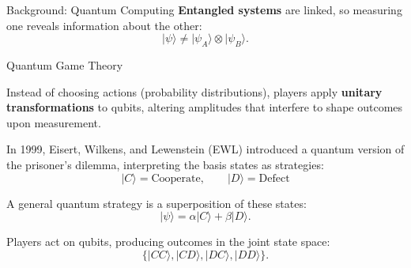 \documentclass[final]{beamer}
\newlength{\colwidth}
\begin{document}
\begin{frame}[t]
\begin{columns}[t]
\begin{column}{\colwidth}
\begin{block}{Background: Quantum Computing}
					\textbf{Entangled systems} are linked, so measuring one reveals information about the other:
					\[
					|\psi\rangle \neq |\psi_A\rangle \otimes |\psi_B\rangle.
					\]
					
				\end{block}
				
				\begin{block}{Quantum Game Theory}
					
					Instead of choosing actions (probability distributions), players apply \textbf{unitary transformations} to qubits, altering amplitudes that interfere to shape outcomes upon measurement.
					
					In 1999, Eisert, Wilkens, and Lewenstein (EWL) introduced a quantum version of the prisoner's dilemma, interpreting the basis states as strategies\cite{Eisert_1999}:
					\[
					|C\rangle = \text{Cooperate}, 
					\qquad 
					|D\rangle = \text{Defect}
					\]
					
					A general quantum strategy is a superposition of these states:
					\[
					|\psi\rangle = \alpha |C\rangle + \beta |D\rangle.
					\]
					
					Players act on qubits, producing outcomes in the joint state space:
					\[
					\{|CC\rangle, |CD\rangle, |DC\rangle, |DD\rangle\}.
					\]
					
					\begin{center}
						\renewcommand{\arraystretch}{1.8}
					\end{center}
					
				\end{block}
				

\end{column}
\end{columns}
\end{frame}
\end{document}
